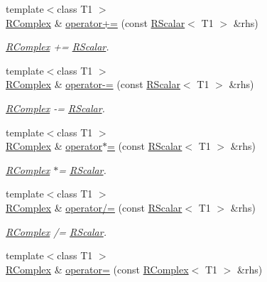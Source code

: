 \begin{DoxyCompactItemize}
{\footnotesize template$<$class T1 $>$ }\\\mbox{\hyperlink{classENSEM_1_1RComplex}{R\+Complex}} \& \mbox{\hyperlink{classENSEM_1_1RComplex_a0a7beaab81b8f5e2129a4c7b1074f85c}{operator+=}} (const \mbox{\hyperlink{classENSEM_1_1RScalar}{R\+Scalar}}$<$ T1 $>$ \&rhs)
\begin{DoxyCompactList}\small\item\em \mbox{\hyperlink{classENSEM_1_1RComplex}{R\+Complex}} += \mbox{\hyperlink{classENSEM_1_1RScalar}{R\+Scalar}}. \end{DoxyCompactList}\item 
{\footnotesize template$<$class T1 $>$ }\\\mbox{\hyperlink{classENSEM_1_1RComplex}{R\+Complex}} \& \mbox{\hyperlink{classENSEM_1_1RComplex_af071c8c8f4d2a2cf17a9e4b01accf6bc}{operator-\/=}} (const \mbox{\hyperlink{classENSEM_1_1RScalar}{R\+Scalar}}$<$ T1 $>$ \&rhs)
\begin{DoxyCompactList}\small\item\em \mbox{\hyperlink{classENSEM_1_1RComplex}{R\+Complex}} -\/= \mbox{\hyperlink{classENSEM_1_1RScalar}{R\+Scalar}}. \end{DoxyCompactList}\item 
{\footnotesize template$<$class T1 $>$ }\\\mbox{\hyperlink{classENSEM_1_1RComplex}{R\+Complex}} \& \mbox{\hyperlink{classENSEM_1_1RComplex_aaf2adc526cdbb0b29931b21311cd74fe}{operator$\ast$=}} (const \mbox{\hyperlink{classENSEM_1_1RScalar}{R\+Scalar}}$<$ T1 $>$ \&rhs)
\begin{DoxyCompactList}\small\item\em \mbox{\hyperlink{classENSEM_1_1RComplex}{R\+Complex}} $\ast$= \mbox{\hyperlink{classENSEM_1_1RScalar}{R\+Scalar}}. \end{DoxyCompactList}\item 
{\footnotesize template$<$class T1 $>$ }\\\mbox{\hyperlink{classENSEM_1_1RComplex}{R\+Complex}} \& \mbox{\hyperlink{classENSEM_1_1RComplex_ace62972244741ac0abcf1d3d1e833604}{operator/=}} (const \mbox{\hyperlink{classENSEM_1_1RScalar}{R\+Scalar}}$<$ T1 $>$ \&rhs)
\begin{DoxyCompactList}\small\item\em \mbox{\hyperlink{classENSEM_1_1RComplex}{R\+Complex}} /= \mbox{\hyperlink{classENSEM_1_1RScalar}{R\+Scalar}}. \end{DoxyCompactList}\item 
{\footnotesize template$<$class T1 $>$ }\\\mbox{\hyperlink{classENSEM_1_1RComplex}{R\+Complex}} \& \mbox{\hyperlink{classENSEM_1_1RComplex_a14a5d3857ebb326ed5f211cc30da3ced}{operator=}} (const \mbox{\hyperlink{classENSEM_1_1RComplex}{R\+Complex}}$<$ T1 $>$ \&rhs)

\end{DoxyCompactItemize}
